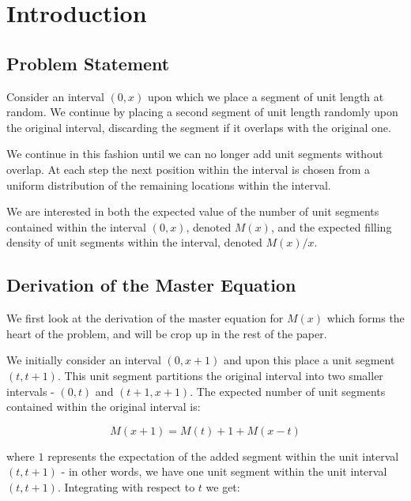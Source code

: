 
\chapter{Introduction}











\section{Problem Statement}

Consider an interval $(0, x)$ upon which we place a segment of unit length 
at random. We continue by placing a second segment of unit length randomly 
upon the original interval, discarding the segment if it overlaps with the 
original one. \bigskip

We continue in this fashion until we can no longer add unit segments without 
overlap. At each step the next position within the interval is chosen from a 
uniform distribution of the remaining locations within the interval. \bigskip

We are interested in both the expected value of the number of unit segments 
contained within the interval $(0, x)$, denoted $M(x)$, and the expected 
filling density of unit segments within the interval, denoted $M(x) / x$. \bigskip






\section{Derivation of the Master Equation}

We first look at the derivation of the master equation for $M(x)$ which forms the 
heart of the problem, and will be crop up in the rest of the paper. \bigskip

We initially consider an interval $(0, x + 1)$ and upon this place a unit segment 
$(t, t + 1)$. This unit segment partitions the original interval into two smaller 
intervals - $(0, t)$ and $(t + 1, x + 1)$. The expected number of unit segments 
contained within the original interval is: \bigskip

\[
	M(x + 1) = M(t) + 1 + M(x - t)
\]\medskip

where $1$ represents the expectation of the added segment within the unit interval 
$(t, t + 1)$ - in other words, we have one unit segment within the unit interval 
$(t, t + 1)$. Integrating with respect to $t$ we get: \bigskip

